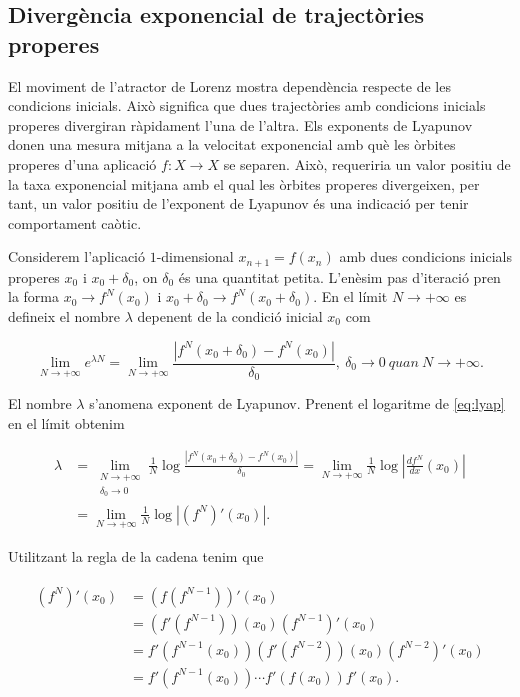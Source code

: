 \documentclass[11pt,a4paper,openright,oneside]{article}
\numberwithin{equation}{section}
\theoremstyle{definition}
\begin{document}
\subsection*{Divergència exponencial de trajectòries properes}
El moviment de l'atractor de Lorenz mostra dependència respecte de les condicions inicials. Això significa que dues trajectòries amb condicions inicials properes divergiran ràpidament l'una de l'altra. Els exponents de Lyapunov donen una mesura mitjana a la velocitat exponencial amb què les òrbites properes d'una aplicació $f:X\rightarrow{X}$ se separen. Això, requeriria un valor positiu de la taxa exponencial mitjana amb el qual les òrbites properes divergeixen, per tant, un valor positiu de l'exponent de Lyapunov és una indicació per tenir comportament caòtic.

Considerem l'aplicació $1$-dimensional $x_{n+1}=f(x_n)$ amb dues condicions inicials properes $x_0$ i $x_0+\delta_0$, on $\delta_0$ és una quantitat petita. L'enèsim pas d'iteració pren la forma $x_0\rightarrow{f^N(x_0)}$ i $x_0+\delta_0\rightarrow{f^N(x_0+\delta_0)}$. En el límit $N\rightarrow{+\infty}$ es defineix el nombre $\lambda$ depenent de la condició inicial $x_0$ com 

\begin{equation} \label{eq:lyap}
    \lim_{N \to +\infty} e^{\lambda N} = \lim_{N \to +\infty} \frac{\left\lvert f^N(x_0 + \delta_0)-f^N(x_0)\right\rvert}{\delta_0}, \ \delta_0 \rightarrow{0} \ \textit{quan} \ N \rightarrow{+\infty}.   
\end{equation}

El nombre $\lambda$ s'anomena exponent de Lyapunov. Prenent el logaritme de \eqref{eq:lyap} en el límit obtenim

\begin{equation*}\begin{aligned}
    \lambda&=\lim_{\substack{N\to+\infty \\ \delta_0 \to 0}}\frac{1}{N}\log\frac{\left\lvert f^N(x_0+\delta_0)-f^N(x_0)\right\rvert}{\delta_0}=\lim_{N\to+\infty}\frac{1}{N}\log \left\lvert\frac{df^N}{dx}(x_0) \right\rvert \\
    &=\lim_{N\to+\infty}\frac{1}{N}\log\left\lvert\left(f^N\right)'(x_0)\right\rvert.
\end{aligned}\end{equation*}

Utilitzant la regla de la cadena tenim que

\begin{equation} \begin{split} \begin{aligned} \label{eq:reg_cadena}
     \left(f^N\right)'(x_0) &= \left(f\left(f^{N-1}\right) \right)'(x_0) \\
     &=  \left(f'\left(f^{N-1}\right)\right)(x_0)\left(f^{N-1}\right)'(x_0) \\ 
     &= f'\left(f^{N-1}(x_0)\right) \left(f'\left(f^{N-2}\right)\right)(x_0) \left(f^{N-2}\right)'(x_0) \\
     & = f'\left(f^{N-1}(x_0)\right) \cdots f'\left(f(x_0)\right)f'(x_0).    
\end{aligned}\end{split}\end{equation}
\end{document}
